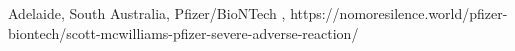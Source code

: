                 {
                  Adelaide, South Australia, 
                }
                {
                }
                {
                  Pfizer/BioNTech
                }
                {
                }
                {
                  ,
                }
                {
                  https://nomoresilence.world/pfizer-biontech/scott-mcwilliams-pfizer-severe-adverse-reaction/
                }


